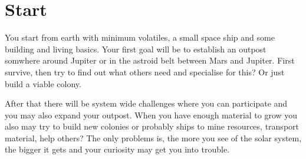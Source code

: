 \section{Start}

You start from earth with minimum volatiles, a small space ship and some building and living basics. Your first goal will be to establish an outpost somwhere around Jupiter or in the astroid belt between Mars and Jupiter. First survive, then try to find out what others need and specialise for this? Or just build a viable colony.

After that there will be system wide challenges where you can participate and you may also expand your outpost. When you have enough material to grow you also may try to build new colonies or probably ships to mine resources, transport material, help others? The only problems is, the more you see of the solar system, the bigger it gets and your curiosity may get you into
trouble.

